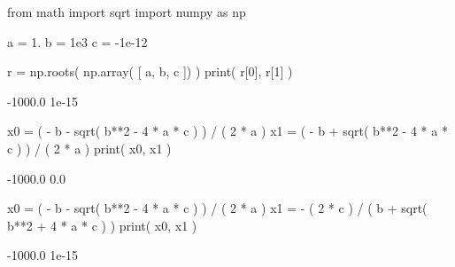 \documentclass[pdftex,11pt]{article}
\begin{document}
\begin{python}
from math import sqrt
import numpy as np
\end{python}
\begin{python}
a = 1.
b = 1e3
c = -1e-12
\end{python}
\begin{python}
r = np.roots( np.array( [ a, b, c ]) )
print( r[0], r[1] )
\end{python}
\begin{pythonoutput}
-1000.0 1e-15
\end{pythonoutput}
\begin{python}
x0 = ( - b - sqrt( b**2 - 4 * a * c ) ) / ( 2 * a )
x1 = ( - b + sqrt( b**2 - 4 * a * c ) ) / ( 2 * a )
print( x0, x1 )
\end{python}
\begin{pythonoutput}
-1000.0 0.0
\end{pythonoutput}
\begin{python}
x0 = ( - b - sqrt( b**2 - 4 * a * c ) ) / ( 2 * a )
x1 = - ( 2 * c ) / ( b + sqrt( b**2 + 4 * a * c ) )
print( x0, x1 )
\end{python}
\begin{pythonoutput}
-1000.0 1e-15
\end{pythonoutput}
\end{document}
